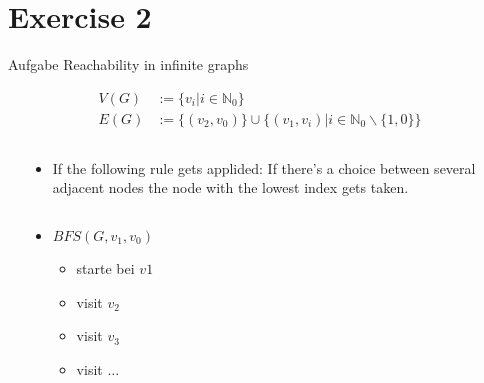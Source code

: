 
\section{Exercise 2}

\setcounter{exercise}{1}

\begin{frame}[allowframebreaks]{Aufgabe \thesection}{Reachability in infinite graphs}
  \begin{exercisenoinc}    
    \begin{align*}
      V(G) &:= \{v_i | i \in \mathbb{N}_0\}\\
      E(G) &:= \{(v_2,v_0)\}\cup \{(v_1,v_i)| i \in \mathbb{N}_0\backslash \{1,0\}\}
    \end{align*}
  \end{exercisenoinc}
  \begin{solution}
    \begin{columns}
      \begin{column}[t]{0.5\textwidth}
      \end{column}
      \begin{column}[t]{0.5\textwidth}
        \vspace{0.25cm}
        \begin{itemize}
          \item \alert{If the following rule gets applided:} If there's a choice between several adjacent nodes the node with the lowest index gets taken.
        \end{itemize}
        \begin{columns}
          \begin{column}[t]{0.5\linewidth}
            \begin{itemize}
              \item $BFS(G, v_1, v_0)$
              \begin{itemize}
                \item starte bei $v1$
                \item visit $v_2$
                \item visit $v_3$
                \item visit $\ldots$

\end{itemize}
\end{itemize}
\end{column}
\end{columns}
\end{column}
\end{columns}
\end{solution}
\end{frame}
